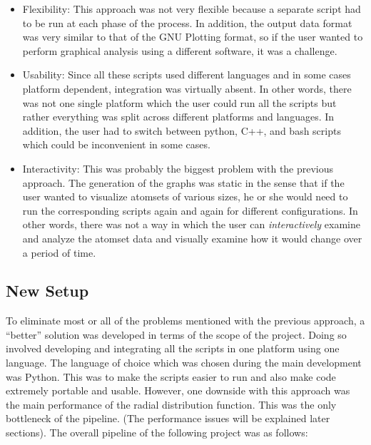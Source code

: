 \begin{itemize}
    \item Flexibility: This approach was not very flexible because a separate script had to be run at each phase of the process. In addition, the output data format was very similar to that of the GNU Plotting format, so if the user wanted to perform graphical analysis using a different software, it was a challenge.
    
    \item Usability: Since all these scripts used different languages and in some cases platform dependent, integration was virtually absent. In other words, there was not one single platform which the user could run all the scripts but rather everything was split across different platforms and languages. In addition, the user had to switch between python, C++, and bash scripts which could be inconvenient in some cases. 
    
    \item Interactivity: This was probably the biggest problem with the previous approach. The generation of the graphs was static in the sense that if the user wanted to visualize atomsets of various sizes, he or she would need to run the corresponding scripts again and again for different configurations. In other words, there was not a way in which the user can \textit{interactively} examine and analyze the atomset data and visually examine how it would change over a period of time.
\end{itemize}

\subsection*{New Setup}

To eliminate most or all of the problems mentioned with the previous approach, a ``better'' solution was developed in terms of the scope of the project. Doing so involved developing and integrating all the scripts in one platform using one language. The language of choice which was chosen during the main development was Python. This was to make the scripts easier to run and also make code extremely portable and usable. However, one downside with this approach was the main performance of the radial distribution function. This was the only bottleneck of the pipeline. (The performance issues will be explained later sections). The overall pipeline of the following project was as follows:

